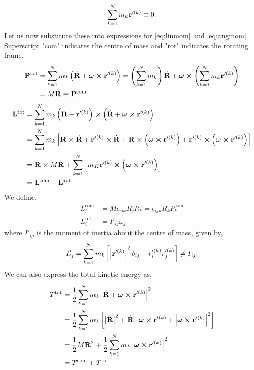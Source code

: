 \documentclass{book}
\begin{document}
\begin{equation}
    \sum_{k=1}^N  m_k\vb{r}'^{(k)} \equiv 0. \label{masssum}
\end{equation}
Let us now substitute these into expressions for \eqref{eq:linmom} and \eqref{eq:angmom}. Superscript "$\text{com}$" indicates the centre of mass and "$\text{rot}$" indicates the rotating frame.
\begin{equation}
\begin{split}
    \vb{P}^{\text{tot}} & = \sum_{k=1}^Nm_k\left(\Dot{\vb{R}} + \vb*{\omega}\cross\vb{r}'^{(k)}\right) = \left(\sum_{k=1}^Nm_k\right)\Dot{\vb{R}} + \vb*{\omega}\cross\left(\sum_{k=1}^Nm_k\vb{r}'^{(k)}\right) \\ 
    & = M\Dot{\vb{R}} \equiv \vb{P}^{\text{com}}
\end{split}
\end{equation}
\begin{equation}
\begin{split}
    \vb{L}^{\text{tot}} & = \sum_{k=1}^Nm_k \left(\vb{R}+\vb{r}'^{(k)}\right) \cross\left(\Dot{\vb{R}}+\vb*{\omega}\cross\vb{r}'^{(k)}\right) \\
    & = \sum_{k=1}^Nm_k \left[\vb{R}\cross\Dot{\vb{R}} + \vb{r}'^{(k)}\cross\Dot{\vb{R}} + \vb{R}\cross\left(\vb*{\omega}\cross\vb{r}'^{(k)}\right) + \vb{r}'^{(k)}\cross\left(\vb*{\omega}\cross\vb{r}'^{(k)}\right)\right] \\
    & = \vb{R}\cross M \Dot{\vb{R}} + \sum_{k=1}^N\left[m_K\vb{r}'^{(k)}\cross\left(\vb*{\omega}\cross\vb{r}'^{(k)}\right)\right] \\
    &= \vb{L^{\text{com}}} + \vb{L^{\text{rot}}}
\end{split}
\end{equation}
We define,
\begin{align}
    L_i^{\text{com}} & = M\epsilon_{ijk}R_j\Dot{R}_k = \epsilon_{ijk}R_kP_k^{\text{com}} \\
    L_i^{\text{rot}} & = I'_{ij}\omega_j
\end{align}
where $I'_{ij}$ is the moment of inertia about the centre of mass, given by,
\begin{equation}
    I'_{ij} = \sum_{k=1}^Nm_k\left[\left|\vb{r}'^{(k)}\right|^2\delta_{ij} - r_i'^{(k)}r_j'^{(k)}\right] \neq I_{ij}.
\end{equation}
We can also express the total kinetic energy as,
\begin{equation}
\begin{split}
    T^{\text{tot}} & = \frac{1}{2}\sum_{k=1}^Nm_k\left|\Dot{\vb{R}} + \vb*{\omega}\cross\vb{r}'^{(k)}\right|^2 \\
    & =  \frac{1}{2}\sum_{k=1}^Nm_k\left[\left|\Dot{\vb{R}}\right|^2 + \Dot{\vb{R}}\cdot\vb*{\omega}\cross\vb{r}'^{(k)} + \left|\vb*{\omega}\cross\vb{r}'^{(k)}\right|^2\right] \\
    & = \frac{1}{2}M\Dot{\vb{R}}^2 + \frac{1}{2}\sum_{k=1}^Nm_k\left|\vb*{\omega}\cross\vb{r}'^{(k)}\right|^2 \\
    & = T^{\text{com}} + T^{\text{rot}}
\end{split}
\end{equation}
\end{document}
